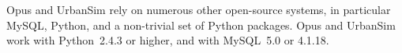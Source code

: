 Opus and UrbanSim rely on numerous other open-source systems, in particular
MySQL, Python, and a non-trivial set of Python packages.  Opus and UrbanSim
work with Python~2.4.3 or higher, \pythonversionindex and with
MySQL~5.0 or 4.1.18.\mysqlversionindex


